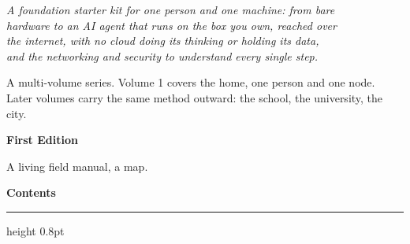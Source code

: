 \begin{titlepage}
\vspace{26pt minus 10pt}

{\itshape\normalsize\color{softblack!75}
A foundation starter kit for one person and one machine: from bare\\
hardware to an AI agent that runs on the box you own, reached over\\
the internet, with no cloud doing its thinking or holding its data,\\
and the networking and security to understand every single step.\par}

\vfill

{\sffamily\footnotesize\color{softblack!60}
A multi-volume series. Volume 1 covers the home, one person and one node.\\
Later volumes carry the same method outward: the school, the university, the city.\par}
\vspace{16pt minus 6pt}
{\sffamily\small\color{accentlt}\textbf{First Edition}\par}
\vspace{4pt minus 1pt}
{\sffamily\footnotesize\color{softblack!55} A living field manual, a map.\par}
\vspace{1.0cm minus 0.7cm}
\end{titlepage}

\setcounter{page}{2}

\clearpage
\thispagestyle{plain}
{\sffamily\Large\bfseries\color{accent}Contents\par}\vspace{6pt}
{\color{rulegray}\hrule height 0.8pt}\vspace{10pt}
\makeatletter
{}
\makeatother
\clearpage
